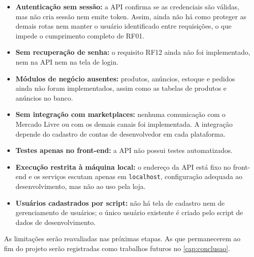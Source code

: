 \begin{itemize}
  \item \textbf{Autenticação sem sessão:} a API confirma se as credenciais são válidas, mas não cria sessão nem emite token. Assim, ainda não há como proteger as demais rotas nem manter o usuário identificado entre requisições, o que impede o cumprimento completo de RF01.
  \item \textbf{Sem recuperação de senha:} o requisito RF12 ainda não foi implementado, nem na API nem na tela de login.
  \item \textbf{Módulos de negócio ausentes:} produtos, anúncios, estoque e pedidos ainda não foram implementados, assim como as tabelas de produtos e anúncios no banco.
  \item \textbf{Sem integração com marketplaces:} nenhuma comunicação com o Mercado Livre ou com os demais canais foi implementada. A integração depende do cadastro de contas de desenvolvedor em cada plataforma.
  \item \textbf{Testes apenas no front-end:} a API não possui testes automatizados.
  \item \textbf{Execução restrita à máquina local:} o endereço da API está fixo no front-end e os serviços escutam apenas em \texttt{localhost}, configuração adequada ao desenvolvimento, mas não ao uso pela loja.
  \item \textbf{Usuários cadastrados por script:} não há tela de cadastro nem de gerenciamento de usuários; o único usuário existente é criado pelo script de dados de desenvolvimento.
\end{itemize}

As limitações serão reavaliadas nas próximas etapas. As que permanecerem ao fim do projeto serão registradas como trabalhos futuros no \autoref{cap:conclusao}.
